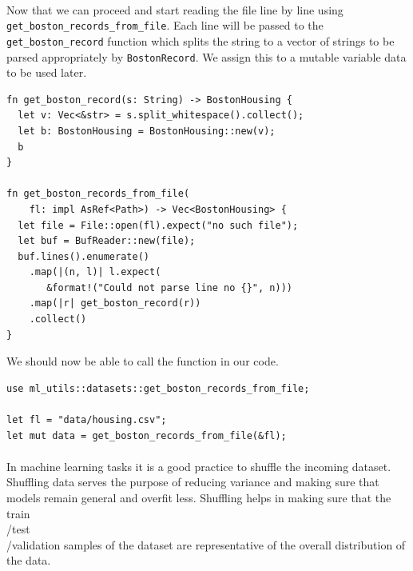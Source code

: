 \documentclass{book}
\begin{document}
\paragraph{}%
Now that we can proceed and start reading the file line by line using \lstinline{get_boston_records_from_file}. Each line will be passed to the \lstinline{get_boston_record} function which splits the string to a vector of strings to be parsed appropriately by \lstinline{BostonRecord}. We assign this to a mutable variable data to be used later.
\label{par:}

\begin{lstlisting}[caption={chapter2\\/ml\\-utils\\/src\\/datasets\\.rs}]
fn get_boston_record(s: String) -> BostonHousing {
  let v: Vec<&str> = s.split_whitespace().collect();
  let b: BostonHousing = BostonHousing::new(v);
  b
}

fn get_boston_records_from_file(
    fl: impl AsRef<Path>) -> Vec<BostonHousing> {
  let file = File::open(fl).expect("no such file");
  let buf = BufReader::new(file);
  buf.lines().enumerate()
    .map(|(n, l)| l.expect(
       &format!("Could not parse line no {}", n)))
    .map(|r| get_boston_record(r))
    .collect()
}
\end{lstlisting}

We should now be able to call the function in our code.

\begin{lstlisting}[caption={chapter2\\/rustlymachine\_regression\\/src\\/lin\_reg\\.rs}]
use ml_utils::datasets::get_boston_records_from_file;

let fl = "data/housing.csv";
let mut data = get_boston_records_from_file(&fl);
\end{lstlisting}

\paragraph{}%
In machine learning tasks it is a good practice to shuffle the incoming dataset. Shuffling data serves the purpose of reducing variance and making sure that models remain general and overfit less. Shuffling helps in making sure that the train\\/test\\/validation samples of the dataset are representative of the overall distribution of the data.
\label{par:}
\end{document}
